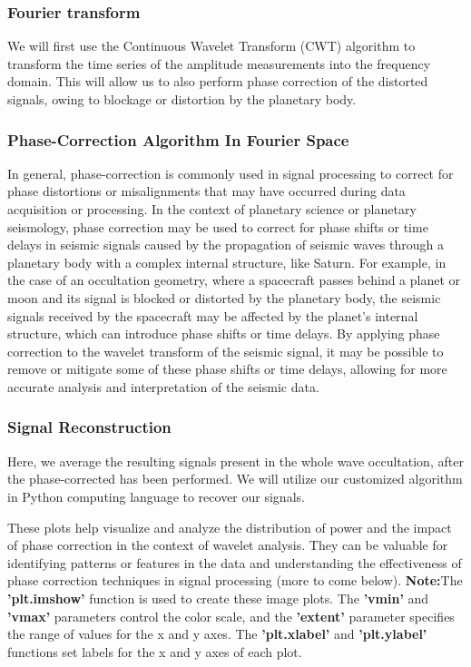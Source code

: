 \documentclass[conference]{IEEEtran}
\begin{document}
\subsubsection{Fourier transform}We will first use the Continuous Wavelet Transform (CWT) algorithm to transform the time series of the amplitude measurements into the frequency domain. This will allow us to also perform phase correction of the distorted signals, owing to blockage or distortion by the planetary body.
\subsubsection{Phase-Correction Algorithm In Fourier Space}In general, phase-correction is commonly used in signal processing to correct for phase distortions or misalignments that may have occurred during data acquisition or processing. In the context of planetary science or planetary seismology, phase correction may be used to correct for phase shifts or time delays in seismic signals caused by the propagation of seismic waves through a planetary body with a complex internal structure, like Saturn. For example, in the case of an occultation geometry, where a spacecraft passes behind a planet or moon and its signal is blocked or distorted by the planetary body, the seismic signals received by the spacecraft may be affected by the planet's internal structure, which can introduce phase shifts or time delays. By applying phase correction to the wavelet transform of the seismic signal, it may be possible to remove or mitigate some of these phase shifts or time delays, allowing for more accurate analysis and interpretation of the seismic data.
\subsubsection{Signal Reconstruction}Here, we average the resulting signals present in the whole wave occultation, after the phase-corrected has been performed. We will utilize our customized algorithm in Python computing language to recover our signals.

These plots help visualize and analyze the distribution of power and the impact of phase correction in the context of wavelet analysis. They can be valuable for identifying patterns or features in the data and understanding the effectiveness of phase correction techniques in signal processing (more to come below).
\vspace{0.5}
\textbf{Note:}The \textbf{'plt.imshow'} function is used to create these image plots. The \textbf{'vmin'} and \textbf{'vmax'} parameters control the color scale, and the \textbf{'extent'} parameter specifies the range of values for the x and y axes. The \textbf{'plt.xlabel'} and \textbf{'plt.ylabel'} functions set labels for the x and y axes of each plot.
\end{document}

